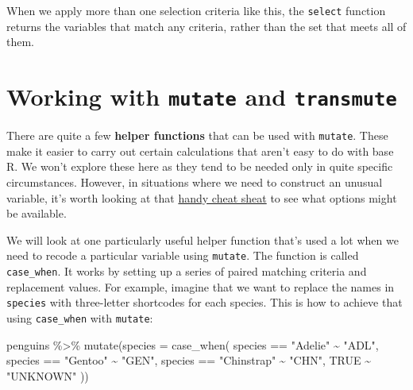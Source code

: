 \documentclass[
]{book}
\newenvironment{Shaded}{\begin{snugshade}}{\end{snugshade}}
\newcommand{\AttributeTok}[1]{\textcolor[rgb]{0.77,0.63,0.00}{#1}}
\newcommand{\ConstantTok}[1]{\textcolor[rgb]{0.00,0.00,0.00}{#1}}
\newcommand{\FunctionTok}[1]{\textcolor[rgb]{0.00,0.00,0.00}{#1}}
\newcommand{\NormalTok}[1]{#1}
\newcommand{\SpecialCharTok}[1]{\textcolor[rgb]{0.00,0.00,0.00}{#1}}
\newcommand{\StringTok}[1]{\textcolor[rgb]{0.31,0.60,0.02}{#1}}
\begin{document}
When we apply more than one selection criteria like this, the \texttt{select} function returns the variables that match any criteria, rather than the set that meets all of them.

\hypertarget{working-with-mutate-and-transmute}{%
\section{\texorpdfstring{Working with \texttt{mutate} and \texttt{transmute}}{Working with mutate and transmute}}\label{working-with-mutate-and-transmute}}

There are quite a few \textbf{helper functions} that can be used with \texttt{mutate}. These make it easier to carry out certain calculations that aren't easy to do with base R. We won't explore these here as they tend to be needed only in quite specific circumstances. However, in situations where we need to construct an unusual variable, it's worth looking at that \href{https://github.com/rstudio/cheatsheets/raw/master/data-transformation.pdf}{handy cheat sheat} to see what options might be available.

We will look at one particularly useful helper function that's used a lot when we need to recode a particular variable using \texttt{mutate}. The function is called \texttt{case\_when}. It works by setting up a series of paired matching criteria and replacement values. For example, imagine that we want to replace the names in \texttt{species} with three-letter shortcodes for each species. This is how to achieve that using \texttt{case\_when} with \texttt{mutate}:

\begin{Shaded}
\begin{Highlighting}[]
\NormalTok{penguins }\SpecialCharTok{\%\textgreater{}\%} 
  \FunctionTok{mutate}\NormalTok{(}\AttributeTok{species =} \FunctionTok{case\_when}\NormalTok{(}
\NormalTok{           species }\SpecialCharTok{==} \StringTok{"Adelie"}    \SpecialCharTok{\textasciitilde{}} \StringTok{"ADL"}\NormalTok{,}
\NormalTok{           species }\SpecialCharTok{==} \StringTok{"Gentoo"}    \SpecialCharTok{\textasciitilde{}} \StringTok{"GEN"}\NormalTok{,}
\NormalTok{           species }\SpecialCharTok{==} \StringTok{"Chinstrap"} \SpecialCharTok{\textasciitilde{}} \StringTok{"CHN"}\NormalTok{,}
           \ConstantTok{TRUE} \SpecialCharTok{\textasciitilde{}} \StringTok{"UNKNOWN"}
\NormalTok{         )) }
\end{Highlighting}
\end{Shaded}
\end{document}
